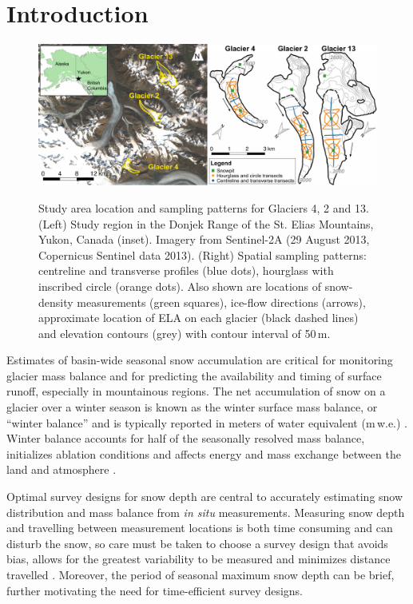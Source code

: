 \documentclass{article}
\begin{document}
\section{Introduction}

\begin{figure}
	\centering
	\includegraphics[width =\textwidth]{Pulwicki_Fig1.pdf}\\
	\caption{Study area location and sampling patterns for Glaciers 4, 2 and 13. (Left) Study region in the Donjek Range of the St. Elias Mountains, Yukon, Canada (inset). Imagery from Sentinel-2A (29 August 2013, Copernicus Sentinel data 2013). (Right) Spatial sampling patterns:  centreline and transverse profiles (blue dots), hourglass with inscribed circle (orange dots). Also shown are locations of snow-density measurements  (green squares), ice-flow directions (arrows), approximate location of ELA on each glacier (black dashed lines) and elevation contours (grey) with contour interval of 50\,m.}
	\label{fig:Sampling}
\end{figure} 

Estimates of basin-wide seasonal snow accumulation are critical for monitoring glacier mass balance and for predicting the availability and timing of surface runoff, especially in mountainous regions. The net accumulation of snow on a glacier over a winter season is known as the winter surface mass balance, or ``winter balance'' and is typically reported in meters of water equivalent (m\,w.e.) \citep{Cogley2011}. Winter balance accounts for half of the seasonally resolved mass balance, initializes ablation conditions and affects energy and mass exchange between the land and atmosphere \citep[e.g.][]{Hock2005, Reveillet2016}. 

Optimal survey designs for snow depth are central to accurately estimating snow distribution and mass balance from \textit{in situ} measurements. Measuring snow depth and travelling between measurement locations is both time consuming and can disturb the snow, so care must be taken to choose a survey design that avoids bias, allows for the greatest variability to be measured and minimizes distance travelled \citep[e.g.][]{Shea2010,Kinar2015}. Moreover, the period of seasonal maximum snow depth can be brief, further motivating the need for time-efficient survey designs. 
\end{document}
